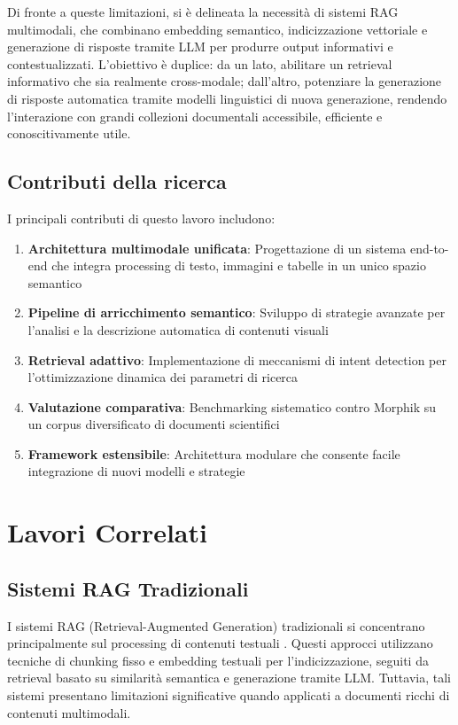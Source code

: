 \documentclass[12pt,a4paper]{article}
\begin{document}
Di fronte a queste limitazioni, si è delineata la necessità di sistemi RAG multimodali, che combinano embedding semantico, indicizzazione vettoriale e generazione di risposte tramite LLM per produrre output informativi e contestualizzati. L'obiettivo è duplice: da un lato, abilitare un retrieval informativo che sia realmente cross-modale; dall'altro, potenziare la generazione di risposte automatica tramite modelli linguistici di nuova generazione, rendendo l'interazione con grandi collezioni documentali accessibile, efficiente e conoscitivamente utile.

\subsection{Contributi della ricerca}
I principali contributi di questo lavoro includono:

\begin{enumerate}
    \item \textbf{Architettura multimodale unificata}: Progettazione di un sistema end-to-end che integra processing di testo, immagini e tabelle in un unico spazio semantico
    \item \textbf{Pipeline di arricchimento semantico}: Sviluppo di strategie avanzate per l'analisi e la descrizione automatica di contenuti visuali
    \item \textbf{Retrieval adattivo}: Implementazione di meccanismi di intent detection per l'ottimizzazione dinamica dei parametri di ricerca
    \item \textbf{Valutazione comparativa}: Benchmarking sistematico contro Morphik su un corpus diversificato di documenti scientifici
    \item \textbf{Framework estensibile}: Architettura modulare che consente facile integrazione di nuovi modelli e strategie
\end{enumerate}

\section{Lavori Correlati}

\subsection{Sistemi RAG Tradizionali}
I sistemi RAG (Retrieval-Augmented Generation) tradizionali si concentrano principalmente sul processing di contenuti testuali \cite{lewis2020retrieval}. Questi approcci utilizzano tecniche di chunking fisso e embedding testuali per l'indicizzazione, seguiti da retrieval basato su similarità semantica e generazione tramite LLM. Tuttavia, tali sistemi presentano limitazioni significative quando applicati a documenti ricchi di contenuti multimodali.
\end{document}
